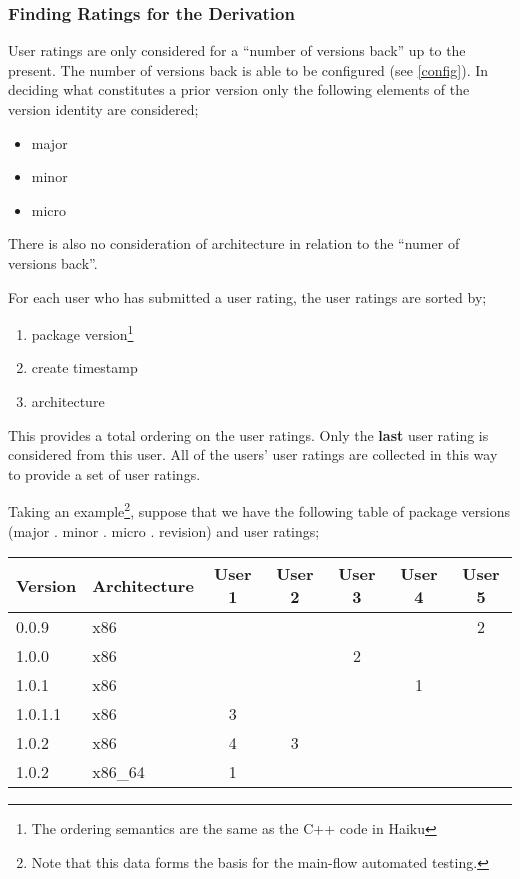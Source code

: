 \subsubsection{Finding Ratings for the Derivation}

User ratings are only considered for a ``number of versions back'' up to the present.  The number of versions back is able to be configured (see \ref{config}).  In deciding what constitutes a prior version only the following elements of the version identity are considered;

\begin{itemize}
\item major
\item minor
\item micro
\end{itemize}

There is also no consideration of architecture in relation to the ``numer of versions back''.

For each user who has submitted a user rating, the user ratings are sorted by;

\begin{enumerate}
\item package version\footnote{The ordering semantics are the same as the C++ code in Haiku}
\item create timestamp
\item architecture
\end{enumerate}

This provides a total ordering on the user ratings.  Only the {\bf last} user rating is considered from this user.  All of the users' user ratings are collected in this way to provide a set of user ratings.

Taking an example\footnote{Note that this data forms the basis for the main-flow automated testing.}, suppose that we have the following table of package versions (major . minor . micro . revision) and user ratings;

\begin{tabular}{ | l | l | c | c | c | c | c | }
\hline
Version & Architecture & User 1 & User 2 & User 3 & User 4 & User 5 \\
\hline
0.0.9 & x86     &   &   &   &   & 2 \\
1.0.0 & x86     &   &   & {\color{red} 2} &   &   \\
1.0.1 & x86     &   &   &   & {\color{red} 1} &   \\
1.0.1.1 & x86   & 3 &   &   &   &   \\
1.0.2 & x86     & 4 & {\color{red} 3} &   &   &   \\
1.0.2 & x86\_64 & {\color{red} 1} &   &   &   &   \\
\hline
\end{tabular}

